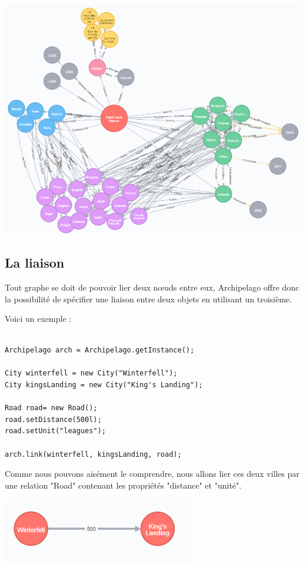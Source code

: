 \documentclass[a4paper,fleqn,12pt]{report}
\begin{document}
\begin{center}
\includegraphics[scale=0.7]{figures/ecoleNeo4J.png}
\label{fig:ecoleNeo4J}
\end{center}

\subsection{La liaison}

Tout graphe se doit de pouvoir lier deux nœuds entre eux, Archipelago offre donc la possibilité de spécifier une liaison entre deux objets en utilisant un troisième. 

Voici un exemple : 

\begin{lstlisting}

Archipelago arch = Archipelago.getInstance();

City winterfell = new City("Winterfell");
City kingsLanding = new City("King's Landing");

Road road= new Road();
road.setDistance(500l);
road.setUnit("leagues");
        
arch.link(winterfell, kingsLanding, road);

\end{lstlisting}

Comme nous pouvons aisément le comprendre, nous allons lier ces deux villes par une relation "Road" contenant les propriétés "distance" et "unité".

\begin{center}
\includegraphics[scale=1]{figures/Rel.png}
\label{fig:Relation}
\end{center}
\end{document}
